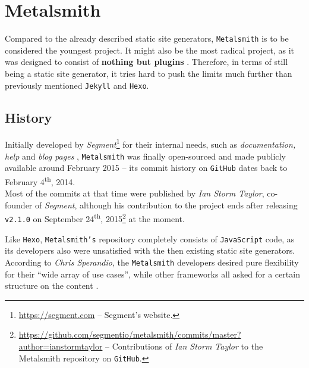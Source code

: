\section{Metalsmith}
\label{sec:metalsmith}

Compared to the already described static site generators, \texttt{Metalsmith} is to be considered the youngest project.
It might also be the most radical project, as it was designed to consist of \textbf{nothing but plugins} \cite[31]{dhillon2016}. Therefore, in terms of still being a static site generator, it tries hard to push the limits much further than previously mentioned \texttt{Jekyll} and \texttt{Hexo}.

\subsection{History}
\label{sec:metalsmith-history}
Initially developed by \emph{Segment}\footnote{\url{https://segment.com} -- Segment's website.} for their internal needs, such as \emph{documentation, help} and \emph{blog pages} \cite{Metalsmith2015buildingblocks}, \texttt{Metalsmith} was finally open-sourced and made publicly available around February 2015 -- its commit history on \texttt{GitHub} dates back to February 4\textsuperscript{th}, 2014.\\
Most of the commits at that time were published by \emph{Ian Storm Taylor}, co-founder of \emph{Segment}, although his contribution to the project ends after releasing \texttt{v2.1.0} on September 24\textsuperscript{th}, 2015\footnote{\url{https://github.com/segmentio/metalsmith/commits/master?author=ianstormtaylor} -- Contributions of \emph{Ian Storm Taylor} to the Metalsmith repository on \texttt{GitHub}.} at the moment.

Like \texttt{Hexo}, \texttt{Metalsmith's} repository completely consists of \texttt{JavaScript} code, as its developers also were unsatisfied with the then existing static site generators. According to \emph{Chris Sperandio}, the \texttt{Metalsmith} developers desired pure flexibility for their ``wide array of use cases'', while other frameworks all asked for a certain structure on the content \cite{Metalsmith2015buildingblocks}.

